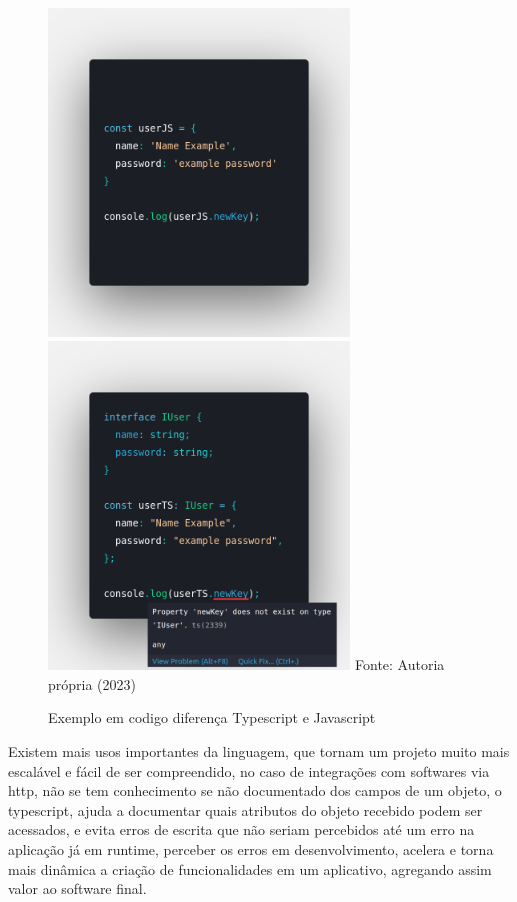 \documentclass{ufersa}
\begin{document}
\begin{figure}[h]
\centering
\caption{Exemplo em codigo diferença Typescript e Javascript}
\includegraphics[width=8cm]{assets/codeJS.png} 
\includegraphics[width=8cm]{assets/codeTS.png}
{\footnotesize Fonte: Autoria própria (2023)}
\label{fig:TypescritXJavascript}
\end{figure}
Existem mais usos importantes da linguagem, que tornam um projeto muito mais escalável e fácil de ser compreendido, no caso de integrações com softwares via http, não se tem conhecimento se não documentado dos campos de um objeto, o typescript, ajuda a documentar quais atributos do objeto recebido podem ser acessados, e evita erros de escrita que não seriam percebidos até um erro na aplicação já em runtime, perceber os erros em desenvolvimento, acelera e torna mais dinâmica a criação de funcionalidades em um aplicativo, agregando assim valor ao software final.
\end{document}

